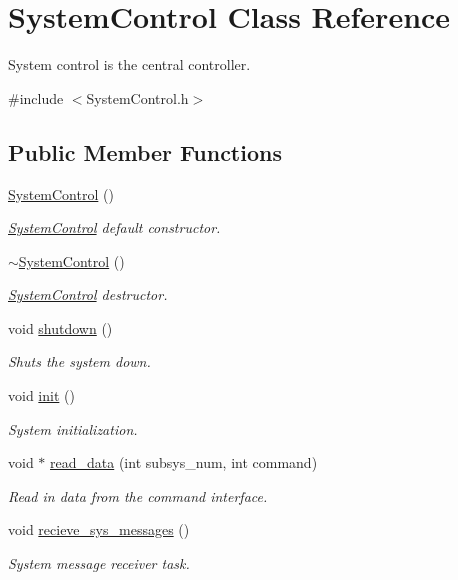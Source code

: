 \hypertarget{classSystemControl}{\section{System\-Control Class Reference}
\label{classSystemControl}
}


System control is the central controller.  




{\ttfamily \#include $<$System\-Control.\-h$>$}

\subsection*{Public Member Functions}
\begin{DoxyCompactItemize}
\item 
\hyperlink{classSystemControl_ae07ba4f7b5ee117619f376efd3b60fa9}{System\-Control} ()
\begin{DoxyCompactList}\small\item\em \hyperlink{classSystemControl}{System\-Control} default constructor. \end{DoxyCompactList}\item 
\hyperlink{classSystemControl_a431eb4f5fbb81a358a345653c7444874}{$\sim$\-System\-Control} ()
\begin{DoxyCompactList}\small\item\em \hyperlink{classSystemControl}{System\-Control} destructor. \end{DoxyCompactList}\item 
void \hyperlink{classSystemControl_a682a998cbfceabd333584ee1006fbf05}{shutdown} ()
\begin{DoxyCompactList}\small\item\em Shuts the system down. \end{DoxyCompactList}\item 
void \hyperlink{classSystemControl_aeb2cd39e5a72b13e139b8bbefb726be6}{init} ()
\begin{DoxyCompactList}\small\item\em System initialization. \end{DoxyCompactList}\item 
void $\ast$ \hyperlink{classSystemControl_ade77f999daab4a062327bbc1a8ad05ef}{read\-\_\-data} (int subsys\-\_\-num, int command)
\begin{DoxyCompactList}\small\item\em Read in data from the command interface. \end{DoxyCompactList}\item 
void \hyperlink{classSystemControl_a25f45e16b1d4dc69ce8c356741feb17d}{recieve\-\_\-sys\-\_\-messages} ()
\begin{DoxyCompactList}\small\item\em System message receiver task. \end{DoxyCompactList}\end{DoxyCompactItemize}
